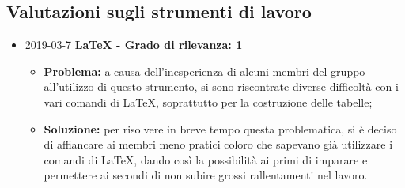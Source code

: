 \subsection{Valutazioni sugli strumenti di lavoro}
\begin{itemize}
				
		\item 2019-03-7 \textbf{\LaTeX{} - Grado di rilevanza: 1} \\
		\begin{itemize}
			\item \textbf{Problema:} a causa dell'inesperienza di alcuni membri del gruppo all'utilizzo di questo strumento, si sono riscontrate diverse difficoltà con i vari comandi di \LaTeX{}, soprattutto per la costruzione delle tabelle;
			\item \textbf{Soluzione:} per risolvere in breve tempo questa problematica, si è deciso di affiancare
		ai membri meno pratici coloro che sapevano già utilizzare i comandi di \LaTeX{}, dando
		così la possibilità ai primi di imparare e permettere ai secondi di non 
		subire grossi rallentamenti nel lavoro.
		\end{itemize}		
		
\end{itemize}
